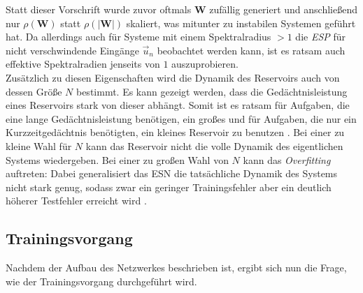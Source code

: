Statt dieser Vorschrift wurde zuvor oftmals $\mathbf{W}$ zufällig generiert und anschließend nur $\rho(\mathbf{W})$ statt $\rho(|\mathbf{W}|)$ skaliert, was mitunter zu instabilen Systemen geführt hat. Da allerdings auch für Systeme mit einem Spektralradius $ > 1$ die \textit{ESP} für nicht verschwindende Eingänge $\vec{u}_n$ beobachtet werden kann, ist es ratsam auch effektive Spektralradien jenseits von $1$ auszuprobieren.\\

Zusätzlich zu diesen Eigenschaften wird die Dynamik des Reservoirs auch von dessen Größe $N$ bestimmt. Es kann gezeigt werden, dass die Gedächtnisleistung eines Reservoirs stark von dieser abhängt. Somit ist es ratsam für Aufgaben, die eine lange Gedächtnisleistung benötigen, ein großes und für Aufgaben, die nur ein Kurzzeitgedächtnis benötigten, ein kleines Reservoir zu benutzen \citep{jeagerTut2002}. Bei einer zu kleine Wahl für $N$ kann das Reservoir nicht die volle Dynamik des eigentlichen Systems wiedergeben. Bei einer zu großen Wahl von $N$ kann das \textit{Overfitting} auftreten: Dabei generalisiert das \textsc{ESN} die tatsächliche Dynamik des Systems nicht stark genug, sodass zwar ein geringer Trainingsfehler aber ein deutlich höherer Testfehler erreicht wird \citep{jeagerTut2002}.


\subsection{Trainingsvorgang}
Nachdem der Aufbau des Netzwerkes beschrieben ist, ergibt sich nun die Frage, wie der Trainingsvorgang durchgeführt wird.

